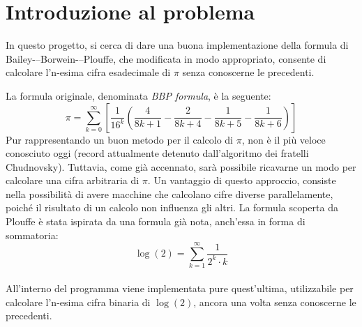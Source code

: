 \section{Introduzione al problema}
In questo progetto, si cerca di dare una buona implementazione della formula di Bailey-–Borwein-–Plouffe, che modificata in modo appropriato, consente di calcolare l'n-esima cifra esadecimale di $\pi$ senza conoscerne le precedenti.

\noindent La formula originale, denominata \textit{BBP formula}, è la seguente:
\begin{equation*}
\pi = \sum\limits_{k=0}^{\infty} \left[ \frac{1}{16^k}\left( \frac{4}{8k+1} - \frac{2}{8k+4} - \frac{1}{8k+5} - \frac{1}{8k+6} \right) \right]
\end{equation*}
Pur rappresentando un buon metodo per il calcolo di $\pi$, non è il più veloce conosciuto oggi (record attualmente detenuto dall'algoritmo dei fratelli Chudnovsky). Tuttavia, come già accennato, sarà possibile ricavarne un modo per calcolare una cifra arbitraria di $\pi$.
Un vantaggio di questo approccio, consiste nella possibilità di avere macchine che calcolano cifre diverse parallelamente, poiché il risultato di un calcolo non influenza gli altri.
\bigbreak \noindent
La formula scoperta da Plouffe è stata ispirata da una formula già nota, anch'essa in forma di sommatoria:
$$ \log(2)= \sum\limits_{k=1}^{\infty} \frac{1}{2^k \cdot k} $$
\\
All'interno del programma viene implementata pure quest'ultima, utilizzabile per calcolare l'n-esima cifra binaria di $\log(2)$, ancora una volta senza conoscerne le precedenti.
